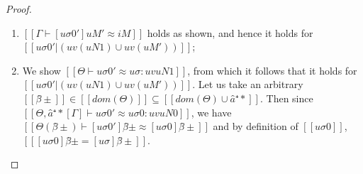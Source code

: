 \begin{proof}
\begin{caseof}
\begin{enumerate}
\begin{enumerate}
                        \item $[[Γ ⊢ [uσ0']uM' ≈ iM]]$ holds as shown,
                            and hence it holds for $[[uσ0'|(uv(uN1) ∪ uv(uM'))]]$;
                        \item We show $[[Θ ⊢ uσ0' ≈ uσ : uv uN1]]$, from which
                            it follows that it holds for\\ $[[uσ0'|(uv(uN1) ∪ uv(uM'))]]$.
                            Let us take an arbitrary 
                            $[[β̂±]] \in [[dom(Θ)]] \subseteq [[dom(Θ) ∪ {â⁺*}]]$. Then 
                            since $[[Θ, â⁺*[Γ] ⊢ uσ0' ≈ uσ0 : uv uN0]]$, 
                            we have $[[Θ(β̂±) ⊢ [uσ0']β̂±  ≈ [uσ0]β̂± ]]$ and 
                            by definition of $[[uσ0]]$, $[[ [uσ0]β̂±  = [uσ]β̂± ]]$.
                    \end{enumerate}
            \end{enumerate}
           

\end{caseof}
\end{proof}
